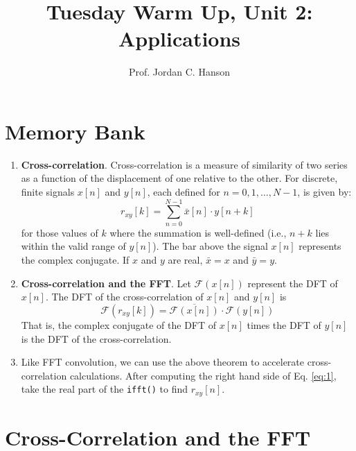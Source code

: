 \documentclass{article}
\begin{document}
\twocolumn

\title{Tuesday Warm Up, Unit 2: Applications}
\author{Prof. Jordan C. Hanson}
\maketitle

\section{Memory Bank}

\begin{enumerate}
\item \textbf{Cross-correlation}.  Cross-correlation is a measure of similarity of two series as a function of the displacement of one relative to the other.  For discrete, finite signals \( x[n] \) and \( y[n] \), each defined for \( n = 0, 1, \ldots, N-1 \), is given by:
\[
r_{xy}[k] = \sum_{n=0}^{N-1} \bar{x}[n] \cdot y[n+k]
\]
for those values of \( k \) where the summation is well-defined (i.e., \( n+k \) lies within the valid range of \( y[n] \)).  The bar above the signal $x[n]$ represents the complex conjugate.  If $x$ and $y$ are real, $\bar{x} = x$ and $\bar{y} = y$.
\item \textbf{Cross-correlation and the FFT}.  Let $\mathcal{F}(x[n])$ represent the DFT of $x[n]$.  The DFT of the cross-correlation of $x[n]$ and $y[n]$ is
\begin{equation}
\mathcal{F}(r_{xy}[k]) = \overline{\mathcal{F}(x[n])}\cdot \mathcal{F}(y[n]) \label{eq:1}
\end{equation}
That is, the complex conjugate of the DFT of $x[n]$ times the DFT of $y[n]$ is the DFT of the cross-correlation.
\item Like FFT convolution, we can use the above theorem to accelerate cross-correlation calculations.  After computing the right hand side of Eq. \ref{eq:1}, take the real part of the \verb+ifft()+ to find $r_{xy}[n]$.
\end{enumerate}

\section{Cross-Correlation and the FFT}
\end{document}
